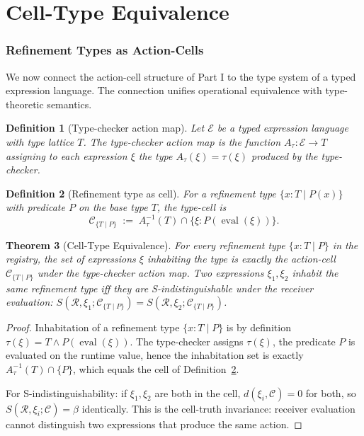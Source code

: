 \documentclass[twocolumn,11pt,a4paper]{article}
\newtheorem{theorem}{Theorem}[section]
\newtheorem{definition}[theorem]{Definition}
\DeclareMathOperator{\eval}{eval}
\newcommand{\Cell}{\mathcal{C}}
\newcommand{\receiver}{\mathcal{R}}
\newcommand{\Sscalar}{S}
\begin{document}
\part{Cell-Type Equivalence}

\section{Refinement Types as Action-Cells}
\label{sec:cell-types}

We now connect the action-cell structure of Part I to the type system of a typed expression language. The connection unifies operational equivalence with type-theoretic semantics.

\begin{definition}[Type-checker action map]
\label{def:type-action}
Let $\mathcal{E}$ be a typed expression language with type lattice $T$. The \emph{type-checker action map} is the function $A_{\tau} : \mathcal{E} \to T$ assigning to each expression $\xi$ the type $A_{\tau}(\xi) = \tau(\xi)$ produced by the type-checker.
\end{definition}

\begin{definition}[Refinement type as cell]
\label{def:refinement-cell}
For a refinement type $\{x : T \mid P(x)\}$ with predicate $P$ on the base type $T$, the \emph{type-cell} is
\[
\Cell_{\{T \mid P\}} \;:=\; A_{\tau}^{-1}(T) \cap \{ \xi : P(\eval(\xi)) \}.
\]
\end{definition}

\begin{theorem}[Cell-Type Equivalence]
\label{thm:cell-type}
For every refinement type $\{x : T \mid P\}$ in the registry, the set of expressions $\xi$ inhabiting the type is exactly the action-cell $\Cell_{\{T \mid P\}}$ under the type-checker action map. Two expressions $\xi_1, \xi_2$ inhabit the same refinement type iff they are S-indistinguishable under the receiver evaluation: $\Sscalar(\receiver, \xi_1; \Cell_{\{T \mid P\}}) = \Sscalar(\receiver, \xi_2; \Cell_{\{T \mid P\}})$.
\end{theorem}

\begin{proof}
Inhabitation of a refinement type $\{x : T \mid P\}$ is by definition $\tau(\xi) = T \wedge P(\eval(\xi))$. The type-checker assigns $\tau(\xi)$, the predicate $P$ is evaluated on the runtime value, hence the inhabitation set is exactly $A_{\tau}^{-1}(T) \cap \{P\}$, which equals the cell of Definition~\ref{def:refinement-cell}.

For S-indistinguishability: if $\xi_1, \xi_2$ are both in the cell, $d(\xi_i, \Cell) = 0$ for both, so $\Sscalar(\receiver, \xi_i; \Cell) = \beta$ identically. This is the cell-truth invariance: receiver evaluation cannot distinguish two expressions that produce the same action.
\end{proof}
\end{document}
